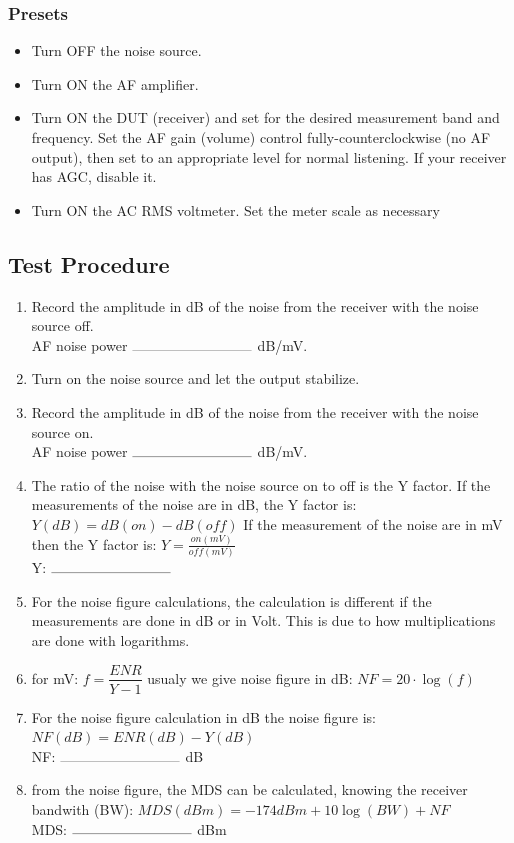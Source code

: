 \documentclass[10pt,letterpaper]{book}
\begin{document}
\subsubsection*{Presets}
\begin{itemize}
	\item Turn OFF the noise source.
	\item Turn ON the AF amplifier.
	\item Turn ON the DUT (receiver) and set for the desired measurement band and frequency. Set the AF gain (volume) control fully-counterclockwise (no AF output), then set to an appropriate level for normal listening. If your receiver has AGC, disable it.
	\item Turn ON the AC RMS voltmeter. Set the meter scale as necessary
\end{itemize}
\subsection*{Test Procedure}
\begin{enumerate}
\item  Record the amplitude in dB of the noise from the receiver with the noise source off.
	\vspace{30pt}
	\\AF noise power $\rule{3cm}{0.1mm}$ dB/mV.
	\item Turn on the noise source and let the output stabilize.
	\item Record the amplitude in dB of the noise from the receiver with the noise source on.
	\vspace{30pt}
	\\AF noise power $\rule{3cm}{0.1mm}$ dB/mV.
	\item The ratio of the noise with the noise source on to off is the Y factor. If the measurements of the noise are in dB, the Y factor is: $ Y(dB) = dB(on) - dB(off)$ If the measurement of the noise are in mV then the Y factor is: $ Y = \frac{on(mV)}{off(mV)} $
	\vspace{30pt}
	\\Y: $\rule{3cm}{0.1mm}$ 
	\item For the noise figure calculations, the calculation is different if the measurements are done in dB or in Volt. This is due to how multiplications are done with logarithms.
	\item for mV:  $ f = \dfrac{ENR}{Y-1} $ usualy we give noise figure in dB: $ NF = 20 \cdot \log(f) $
	\item For the noise figure calculation in dB the noise figure is: $NF(dB) =  ENR(dB) - Y(dB) $
	\vspace{30pt}
	 \\NF: $\rule{3cm}{0.1mm}$  dB
	\item from the noise figure, the MDS can be calculated, knowing the receiver bandwith (BW): $ MDS(dBm) = -174dBm + 10 \log(BW) + NF $ 
	\vspace{30pt}
	 \\MDS: $\rule{3cm}{0.1mm}$ dBm
\end{enumerate}
\end{document}
